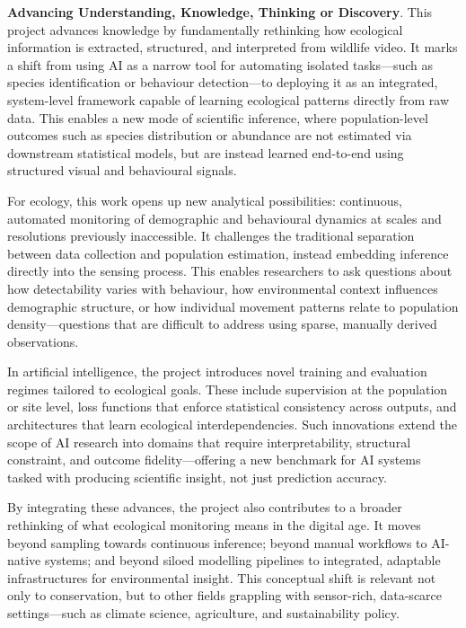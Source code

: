 \textbf{Advancing Understanding, Knowledge, Thinking or Discovery}. This project advances knowledge by fundamentally rethinking how ecological information is extracted, structured, and interpreted from wildlife video. It marks a shift from using AI as a narrow tool for automating isolated tasks—such as species identification or behaviour detection—to deploying it as an integrated, system-level framework capable of learning ecological patterns directly from raw data. This enables a new mode of scientific inference, where population-level outcomes such as species distribution or abundance are not estimated via downstream statistical models, but are instead learned end-to-end using structured visual and behavioural signals.

For ecology, this work opens up new analytical possibilities: continuous, automated monitoring of demographic and behavioural dynamics at scales and resolutions previously inaccessible. It challenges the traditional separation between data collection and population estimation, instead embedding inference directly into the sensing process. This enables researchers to ask questions about how detectability varies with behaviour, how environmental context influences demographic structure, or how individual movement patterns relate to population density—questions that are difficult to address using sparse, manually derived observations.

In artificial intelligence, the project introduces novel training and evaluation regimes tailored to ecological goals. These include supervision at the population or site level, loss functions that enforce statistical consistency across outputs, and architectures that learn ecological interdependencies. Such innovations extend the scope of AI research into domains that require interpretability, structural constraint, and outcome fidelity—offering a new benchmark for AI systems tasked with producing scientific insight, not just prediction accuracy.

By integrating these advances, the project also contributes to a broader rethinking of what ecological monitoring means in the digital age. It moves beyond sampling towards continuous inference; beyond manual workflows to AI-native systems; and beyond siloed modelling pipelines to integrated, adaptable infrastructures for environmental insight. This conceptual shift is relevant not only to conservation, but to other fields grappling with sensor-rich, data-scarce settings—such as climate science, agriculture, and sustainability policy.

